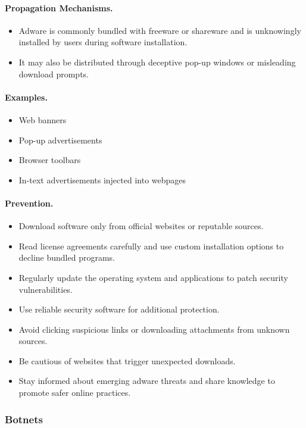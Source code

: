 \paragraph{Propagation Mechanisms.}
\begin{itemize}
  \item Adware is commonly bundled with freeware or shareware and is unknowingly installed by users during software installation.
  \item It may also be distributed through deceptive pop-up windows or misleading download prompts.
\end{itemize}

\paragraph{Examples.}
\begin{itemize}
  \item Web banners
  \item Pop-up advertisements
  \item Browser toolbars
  \item In-text advertisements injected into webpages
\end{itemize}

\paragraph{Prevention.}
\begin{itemize}
  \item Download software only from official websites or reputable sources.
  \item Read license agreements carefully and use custom installation options to decline bundled programs.
  \item Regularly update the operating system and applications to patch security vulnerabilities.
  \item Use reliable security software for additional protection.
  \item Avoid clicking suspicious links or downloading attachments from unknown sources.
  \item Be cautious of websites that trigger unexpected downloads.
  \item Stay informed about emerging adware threats and share knowledge to promote safer online practices.
\end{itemize}

\subsubsection{Botnets}

